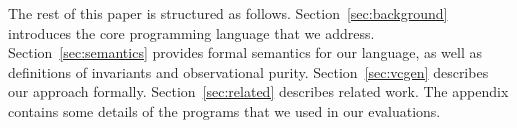 The rest of this paper is structured as
follows. Section~\ref{sec:background} introduces the core programming
language that we address. Section~\ref{sec:semantics} provides formal
semantics for our language, as well as definitions of invariants and
observational purity. Section~\ref{sec:vcgen} describes our approach
formally.
Section~\ref{sec:related} describes related work. The appendix contains some details of the programs
that we used in our evaluations. 

